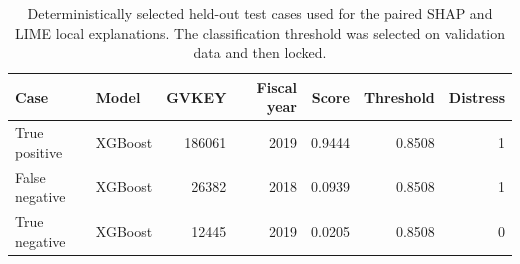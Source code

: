 \begin{table}[htbp]
\centering
\caption{Deterministically selected held-out test cases used for the paired SHAP and LIME local explanations. The classification threshold was selected on validation data and then locked.}
\label{tab:local_explanation_cases}
\small
\begin{tabular}{llrrrrr}
\toprule
Case & Model & GVKEY & Fiscal year & Score & Threshold & Distress \\
\midrule
True positive & XGBoost & 186061 & 2019 & 0.9444 & 0.8508 & 1 \\
False negative & XGBoost & 26382 & 2018 & 0.0939 & 0.8508 & 1 \\
True negative & XGBoost & 12445 & 2019 & 0.0205 & 0.8508 & 0 \\
\bottomrule
\end{tabular}
\end{table}
